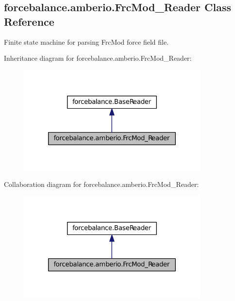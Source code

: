 \hypertarget{classforcebalance_1_1amberio_1_1FrcMod__Reader}{\subsection{forcebalance.\-amberio.\-Frc\-Mod\-\_\-\-Reader \-Class \-Reference}
\label{classforcebalance_1_1amberio_1_1FrcMod__Reader}
}


\-Finite state machine for parsing \-Frc\-Mod force field file.  




\-Inheritance diagram for forcebalance.\-amberio.\-Frc\-Mod\-\_\-\-Reader\-:\nopagebreak
\begin{figure}[H]
\begin{center}
\leavevmode
\includegraphics[width=274pt]{classforcebalance_1_1amberio_1_1FrcMod__Reader__inherit__graph}
\end{center}
\end{figure}


\-Collaboration diagram for forcebalance.\-amberio.\-Frc\-Mod\-\_\-\-Reader\-:\nopagebreak
\begin{figure}[H]
\begin{center}
\leavevmode
\includegraphics[width=274pt]{classforcebalance_1_1amberio_1_1FrcMod__Reader__coll__graph}
\end{center}
\end{figure}
